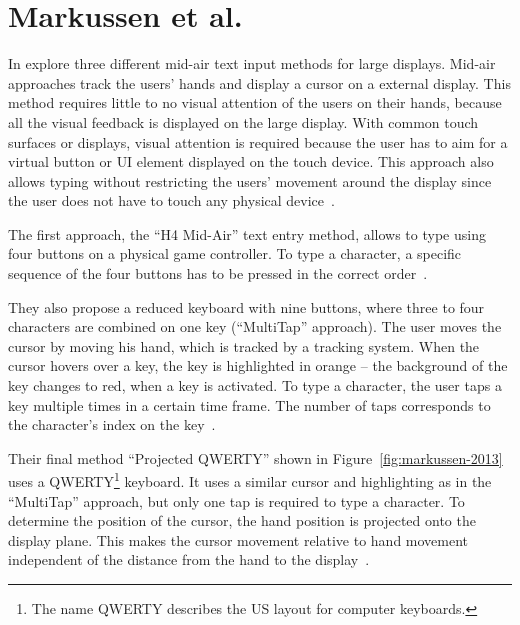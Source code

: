 \section{Markussen et al.}\label{section:markussen-2013}
In {} \citeauthor{Markussen.2013} explore three different mid-air text input methods for large displays. Mid-air approaches track the users' hands and display a cursor on a external display. This method requires little to no visual attention of the users on their hands, because all the visual feedback is displayed on the large display. With common touch surfaces or displays, visual attention is required because the user has to aim for a virtual button or \gls{UI} element displayed on the touch device.
This approach also allows typing without restricting the users' movement around the display since the user does not have to touch any physical device~\cite[401]{Markussen.2013}.

The first approach, the \enquote{H4 Mid-Air} text entry method, allows to type using four buttons on a physical game controller. To type a character, a specific sequence of the four buttons has to be pressed in the correct order~\cite[406]{Markussen.2013}.

They also propose a reduced keyboard with nine buttons, where three to four characters are combined on one key (\enquote{MultiTap} approach). The user moves the cursor by moving his hand, which is tracked by a tracking system. When the cursor hovers over a key, the key is highlighted in orange -- the background of the key changes to red, when a key is activated. To type a character, the user taps a key multiple times in a certain time frame. The number of taps corresponds to the character's index on the key~\cite[407]{Markussen.2013}. %

Their final method \enquote{Projected QWERTY} shown in Figure~\ref{fig:markussen-2013} uses a QWERTY\footnote{The name QWERTY describes the US layout for computer keyboards.} keyboard. It uses a similar cursor and highlighting as in the \enquote{MultiTap} approach, but only one tap is required to type a character. To determine the position of the cursor, the hand position is projected onto the display plane. This makes the cursor movement relative to hand movement independent of the distance from the hand to the display~\cite[408]{Markussen.2013}. 

